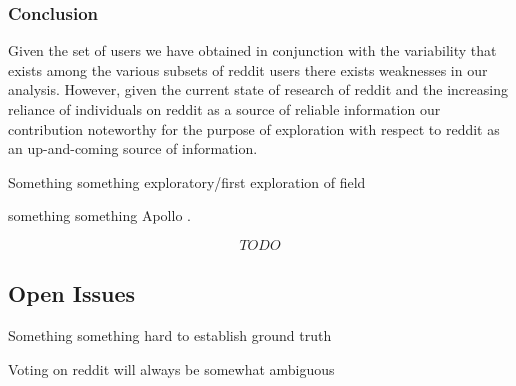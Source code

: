 \subsubsection{Conclusion}

Given the set of users we have obtained in conjunction with the variability that
exists among the various subsets of reddit users there exists weaknesses in our
analysis. However, given the current state of research of reddit and the
increasing reliance of individuals on reddit as a source of reliable information
our contribution noteworthy for the purpose of exploration with respect to
reddit as an up-and-coming source of information.

Something something exploratory/first exploration of field

something something Apollo \cite{Le:2011:DDL:2070942.2071018}.

\[TODO\]



\subsection{Open Issues} %
\label{sub:open_issues}

Something something hard to establish ground truth

Voting on reddit will always be somewhat ambiguous

